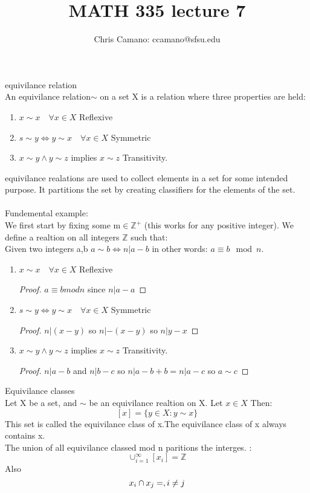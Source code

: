 \documentclass[11pt]{article}
\author{Chris Camano: ccamano@sfsu.edu}
\title{MATH 335  lecture 7 }
\date
\theoremstyle{definition}  %
\newcommand{\Z}{\mathbb{Z}}
\begin{document}
\maketitle
{} equivilance relation\\
An equivilance relation$\sim$ on a set X is a relation where three properties are held:
\begin{enumerate}
  \item $x \sim x \quad \forall x\in X$ Reflexive
  \item $s\sim y \iff y\sim x \quad \forall x \in X$ Symmetric
  \item $x\sim y \land y\sim z $ implies $x\sim z $ Transitivity.
\end{enumerate}
equivilance realations are used to collect elements in a set for some intended purpose. It partitions the set by creating classifiers for the elements of the set. \\\\
Fundemental example:\\

We first start by fixing some m$\in \Z^+$ (this works for any positive integer). We define a realtion on all integers $\Z$ such that: \\
Given two integers a,b $a\sim b \iff n |a-b$ in other words: $a \equiv b \mod n $.

\begin{enumerate}
  \item $x \sim x \quad \forall x\in X$ Reflexive
  \begin{proof}
    $a\equiv b mod n$ since $n|a-a$
  \end{proof}
  \item $s\sim y \iff y\sim x \quad \forall x \in X$ Symmetric
  \begin{proof}
    $n|(x-y)$ so $n|-(x-y)$ so $n|y-x$
  \end{proof}
  \item $x\sim y \land y\sim z $ implies $x\sim z $
   Transitivity.
   \begin{proof}
     $n|a-b$ and $n|b-c$ so $n|a-b+b=n|a-c$ so $a\sim c$
   \end{proof}
\end{enumerate}
 Equivilance classes\\
Let X be a set, and $\sim$ be an equivilance realtion on X. Let $x\in X$ Then:
\[
  [x]=\{y\in X: y\sim x\}
\]
This set is called the equivilance class of x.The equivilance class of x always contains x.
\\
The union of all equivilance classed mod n paritions the interges. :
\[
  \cup_{i=1}^\infty[x_i]=\Z
\]
Also \[
  x_i\cap x_j=\empty , i\neq j
\]\\
\end{document}

